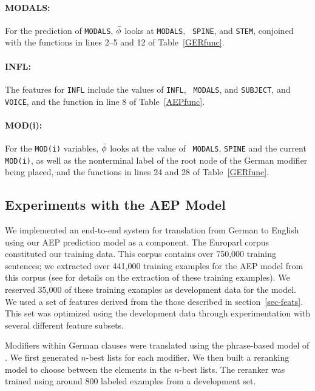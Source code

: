 \documentclass[11pt]{report}
\theoremstyle{plain}
\begin{document}
{\paragraph{MODALS:} 
For the prediction of {\tt MODALS}, $\bar{\phi}$ looks at {\tt MODALS}, {\tt
SPINE}, and {\tt STEM}, conjoined with the functions in lines 2--5 and
12 of Table~\ref{GERfunc}.

\paragraph{INFL:} 
The features for {\tt INFL} include the values of {\tt INFL}, {\tt
MODALS}, and {\tt SUBJECT}, and {\tt VOICE}, and the function in line
8 of Table~\ref{AEPfunc}.

\paragraph{MOD(i):} 
For the {\tt MOD(i)} variables, $\bar{\phi}$ looks at the value of {\tt
MODALS}, {\tt SPINE} and the current {\tt MOD(i)}, as well as the
nonterminal label of the root node of the German modifier being
placed, and the functions in lines 24 and 28 of Table~\ref{GERfunc}.

\subsection{Experiments with the AEP Model}
We implemented an end-to-end system for translation from German to
English using our AEP prediction model as a component. The Europarl
corpus  constituted our training data. This corpus
contains over 750,000 training sentences; we extracted over 441,000
training examples for the AEP model from this corpus (see
 for details on the extraction of these training
examples). We reserved 35,000 of these training examples as
development data for the model. We used a set of features derived from
the those described in section~\ref{sec-feats}. This set was optimized
using the development data through experimentation with several
different feature subsets.

Modifiers within German clauses were translated using the phrase-based
model of . We first generated $n$-best
lists for each modifier. We then built a reranking model to choose
between the elements in the $n$-best lists. The reranker was trained
using around 800 labeled examples from a development set.

}
\end{document}
